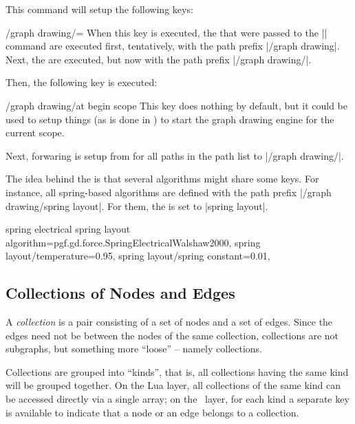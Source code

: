 \begin{command}{\pgfgddeclarealgorithmkey{}}
  This command will setup the following keys:
  
  \begin{key}{/graph drawing/=}
    When this key is executed, the  that were passed to
    the |\pgfgddeclarealgorithmkey| command are executed first,
    tentatively, with the path prefix |/graph drawing|. Next, the
      are executed, but now with the path prefix
    |/graph drawing/|.

    Then, the following key is executed:
    \begin{key}{/graph drawing/at begin scope}
      This key does nothing by default, but it could be used to setup
      things (as is done in \tikzname) to start the graph drawing
      engine for the current scope. 
    \end{key}
  \end{key}

  Next, forwaring is setup from  for all paths in
  the path list to |/graph drawing/|.
  
  The idea behind the  is that several
  algorithms might share some keys. For
  instance, all spring-based algorithms are defined with the path
  prefix |/graph drawing/spring layout|. For them, the
   is set to |spring layout|.
\begin{codeexample}
\pgfgddeclarealgorithmkey
  {spring electrical}
  {spring layout}
  {
    algorithm=pgf.gd.force.SpringElectricalWalshaw2000,
    spring layout/temperature=0.95,
    spring layout/spring constant=0.01,
  }    
\end{codeexample}
\end{command}  



\subsection{Collections of Nodes and Edges}

A \emph{collection} is a pair consisting of a set of nodes and a set of
edges. Since the edges need not be between the nodes of the same
collection, collections are not subgraphs, but something more
``loose'' -- namely collections.

Collections are grouped into ``kinds'', that is, all collections
having the same kind will be grouped together. On the Lua layer, all
collections of the same kind can be accessed directly via a single
array; on the \pgfname\ layer, for each kind a separate key is available
to indicate that a node or an edge belongs to a collection. 

